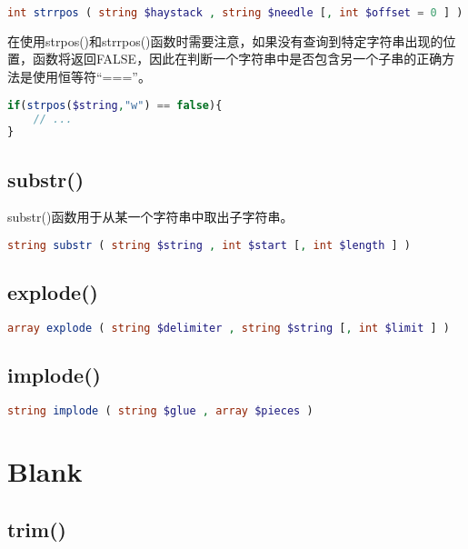 \begin{lstlisting}[language=PHP]
int strrpos ( string $haystack , string $needle [, int $offset = 0 ] )
\end{lstlisting}

在使用strpos()和strrpos()函数时需要注意，如果没有查询到特定字符串出现的位置，函数将返回FALSE，因此在判断一个字符串中是否包含另一个子串的正确方法是使用恒等符“===”。

\begin{lstlisting}[language=PHP]
if(strpos($string,"w") == false){
	// ...
}
\end{lstlisting}


\subsection{substr()}

substr()函数用于从某一个字符串中取出子字符串。

\begin{lstlisting}[language=PHP]
string substr ( string $string , int $start [, int $length ] )
\end{lstlisting}




\subsection{explode()}




\begin{lstlisting}[language=PHP]
array explode ( string $delimiter , string $string [, int $limit ] )
\end{lstlisting}

\subsection{implode()}


\begin{lstlisting}[language=PHP]
string implode ( string $glue , array $pieces )
\end{lstlisting}

\section{Blank}


\subsection{trim()}





